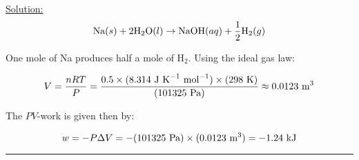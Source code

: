 \noindent
\underline{Solution:}\\

$$\textnormal{Na}(s) + 2\textnormal{H}_2\textnormal{O}(l) \rightarrow \textnormal{NaOH}(aq) + \frac{1}{2}\textnormal{H}_2(g)$$

One mole of Na produces half a mole of H$_2$. Using the ideal gas law:

$$V = \frac{nRT}{P} = \frac{0.5\times(8.314\textnormal{ J K}^{-1}\textnormal{ mol}^{-1})\times(298\textnormal{ K})}{(101325\textnormal{ Pa})} \approx 0.0123\textnormal{ m}^3$$

The $PV$-work is given then by:

$$w = -P\Delta V = -(101325\textnormal{ Pa})\times (0.0123\textnormal{ m}^3) = -1.24\textnormal{ kJ}$$

\hrule\vspace{0.5cm}
